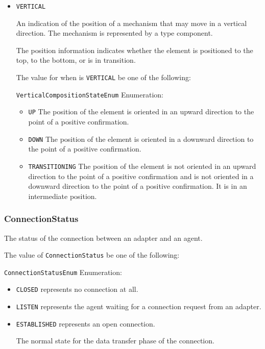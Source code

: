 \begin{itemize}
\item \texttt{VERTICAL}


An indication of the position of a mechanism that may move in a vertical direction. The mechanism is represented by a  type component. 

The position information indicates whether the  element is positioned to the top, to the bottom, or is in transition.


The value for  when  is \texttt{VERTICAL} \MUST be one of the following: 


\texttt{VerticalCompositionStateEnum} Enumeration:

\begin{itemize}
\item \texttt{UP} \newline The position of the  element is oriented in an upward direction to the point of a positive confirmation. 
\item \texttt{DOWN} \newline The position of the  element is oriented in a downward direction to the point of a positive confirmation. 
\item \texttt{TRANSITIONING} \newline The position of the  element is not oriented in an upward direction to the point of a positive confirmation and is not oriented in a downward direction to the point of a positive confirmation. It is in an intermediate position. 
\end{itemize}


\end{itemize}








\subsubsection{ConnectionStatus}
\label{sec:ConnectionStatus}



The status of the connection between an \gls{adapter} and an \gls{agent}.


The value of \texttt{ConnectionStatus} \MUST be one of the following: 


\texttt{ConnectionStatusEnum} Enumeration:

\begin{itemize}
\item \texttt{CLOSED} \newline represents no connection at all. 
\item \texttt{LISTEN} \newline represents the \gls{agent} waiting for a connection request from an \gls{adapter}. 
\item \texttt{ESTABLISHED} \newline represents an open connection.

The normal state for the data transfer phase of the connection. 
\end{itemize}



